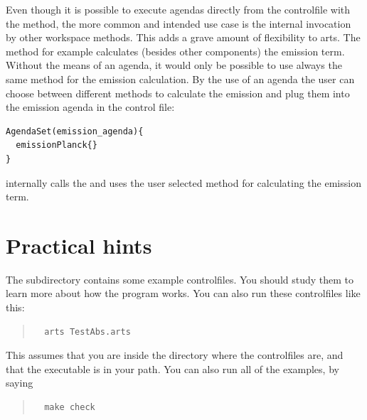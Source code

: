 Even though it is possible to execute agendas directly from the
controlfile with the  method, the more common
and intended use case is the internal invocation by other workspace
methods. This adds a grave amount of flexibility to arts. The
 method for example calculates (besides other
components) the emission term. Without the means of an agenda, it
would only be possible to use always the same method for the emission
calculation. By the use of an agenda the user can choose between
different methods to calculate the emission and plug them into the
emission agenda in the control file:

{\small
\begin{verbatim}
AgendaSet(emission_agenda){
  emissionPlanck{}
}
\end{verbatim}
}

\noindent
{} internally calls the  and
uses the user selected method for calculating the emission term.



\section{Practical hints}
\label{sec:concept:practical}

The subdirectory  contains some example controlfiles.
You should study them to learn more about how the program works. You
can also run these controlfiles like this:
\begin{quote}
\begin{verbatim}
  arts TestAbs.arts
\end{verbatim}
\end{quote}
This assumes that you are inside the directory where the controlfiles
are, and that the  executable is in your path.  You can
also run all of the examples, by saying
\begin{quote}
\begin{verbatim}
  make check
\end{verbatim}
\end{quote}

